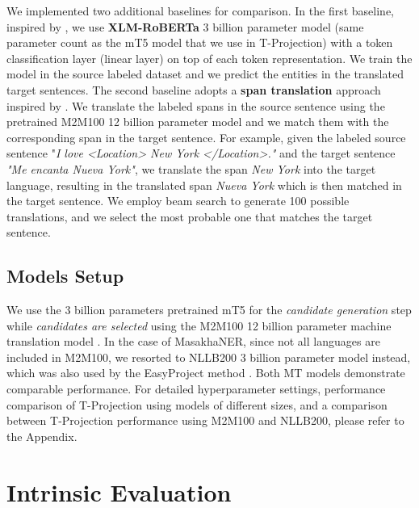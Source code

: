 \documentclass[11pt]{article}
\begin{document}
We implemented two additional baselines for comparison. In the first baseline, inspired by \citet{Li2021crosslingualNE}, we use \textbf{XLM-RoBERTa} \cite{xlmr} 3 billion parameter model (same parameter count as the mT5 model that we use in T-Projection) with a token classification layer (linear layer) on top of each token representation. We train the model in the source labeled dataset and we predict the entities in the translated target sentences. The second baseline adopts a \textbf{span translation} approach inspired by \citet{DBLP:journals/corr/abs-2211-09394}. We translate the labeled spans in the source sentence using the pretrained M2M100 12 billion parameter model and we match them with the corresponding span in the target sentence. For example, given the labeled source sentence "\textit{I love <Location> New York </Location>."} and the target sentence \textit{"Me encanta Nueva York"}, we translate the span \emph{New York} into the target language, resulting in the translated span \emph{Nueva York} which is then matched in the target sentence. We employ beam search to generate 100 possible translations, and we select the most probable one that matches the target sentence.




\subsection{Models Setup}

We use the 3 billion parameters pretrained mT5
\cite{DBLP:conf/naacl/XueCRKASBR21} for the \emph{candidate generation} step while \emph{candidates are selected} using the M2M100 12 billion parameter
machine translation model \cite{DBLP:journals/jmlr/FanBSMEGBCWCGBL21}. In the case of MasakhaNER, since not all languages are included in M2M100, we resorted to NLLB200 \cite{DBLP:journals/corr/abs-2207-04672} 3 billion parameter model instead, which was also used by the EasyProject method \cite{DBLP:journals/corr/abs-2211-15613}. Both MT models demonstrate comparable performance. For detailed hyperparameter settings, performance comparison of T-Projection using models of different sizes, and a comparison between T-Projection performance using M2M100 and NLLB200, please refer to the Appendix.


\section{Intrinsic Evaluation} \label{sec:Results}
\end{document}

